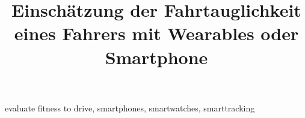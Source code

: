 \documentclass[conference]{IEEEtran}
\begin{document}
\title{Einschätzung der Fahrtauglichkeit eines Fahrers mit Wearables oder Smartphone}

\author{
}

\maketitle

\begin{abstract}

\end{abstract}

\begin{IEEEkeywords}
evaluate fitness to drive, smartphones, smartwatches, smarttracking
\end{IEEEkeywords}









\end{document}
